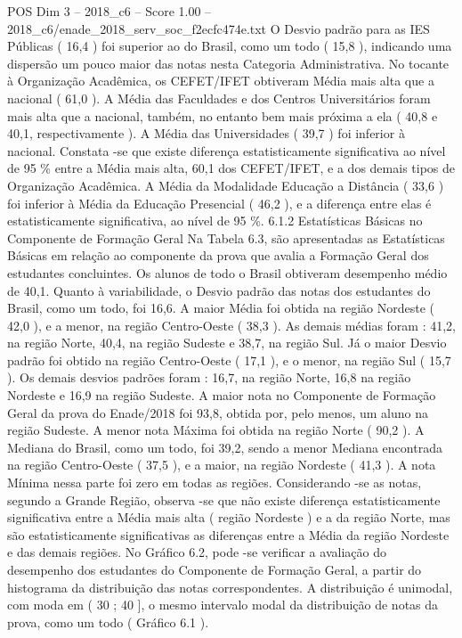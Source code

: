 \begin{textsample}{POS Dim 3 – 2018\_c6 – Score 1.00 – 2018\_c6/enade\_2018\_serv\_soc\_f2ecfc474e.txt}
O Desvio padrão para as IES Públicas ( 16,4 ) foi superior ao do Brasil, como um todo ( 15,8 ), indicando uma dispersão um pouco maior das notas nesta Categoria Administrativa.
No tocante à Organização Acadêmica, os CEFET/IFET obtiveram Média mais alta que a nacional ( 61,0 ).
A Média das Faculdades e dos Centros Universitários foram mais alta que a nacional, também, no entanto bem mais próxima a ela ( 40,8 e 40,1, respectivamente ).
A Média das Universidades ( 39,7 ) foi inferior à nacional.
Constata -se que existe diferença estatisticamente significativa ao nível de 95 \% entre a Média mais alta, 60,1 dos CEFET/IFET, e a dos demais tipos de Organização Acadêmica.
A Média da Modalidade Educação a Distância ( 33,6 ) foi inferior à Média da Educação Presencial ( 46,2 ), e a diferença entre elas é estatisticamente significativa, ao nível de 95 \%. 6.1.2 Estatísticas Básicas no Componente de Formação Geral Na Tabela 6.3, são apresentadas as Estatísticas Básicas em relação ao componente da prova que avalia a Formação Geral dos estudantes concluintes.
Os alunos de todo o Brasil obtiveram desempenho médio de 40,1.
Quanto à variabilidade, o Desvio padrão das notas dos estudantes do Brasil, como um todo, foi 16,6.
A maior Média foi obtida na região Nordeste ( 42,0 ), e a menor, na região Centro-Oeste ( 38,3 ).
As demais médias foram : 41,2, na região Norte, 40,4, na região Sudeste e 38,7, na região Sul.
Já o maior Desvio padrão foi obtido na região Centro-Oeste ( 17,1 ), e o menor, na região Sul ( 15,7 ).
Os demais desvios padrões foram : 16,7, na região Norte, 16,8 na região Nordeste e 16,9 na região Sudeste.
A maior nota no Componente de Formação Geral da prova do Enade/2018 foi 93,8, obtida por, pelo menos, um aluno na região Sudeste.
A menor nota Máxima foi obtida na região Norte ( 90,2 ).
A Mediana do Brasil, como um todo, foi 39,2, sendo a menor Mediana encontrada na região Centro-Oeste ( 37,5 ), e a maior, na região Nordeste ( 41,3 ).
A nota Mínima nessa parte foi zero em todas as regiões.
Considerando -se as notas, segundo a Grande Região, observa -se que não existe diferença estatisticamente significativa entre a Média mais alta ( região Nordeste ) e a da região Norte, mas são estatisticamente significativas as diferenças entre a Média da região Nordeste e das demais regiões.
No Gráfico 6.2, pode -se verificar a avaliação do desempenho dos estudantes do Componente de Formação Geral, a partir do histograma da distribuição das notas correspondentes.
A distribuição é unimodal, com moda em ( 30 ; 40 ], o mesmo intervalo modal da distribuição de notas da prova, como um todo ( Gráfico 6.1 ).

\end{textsample}
